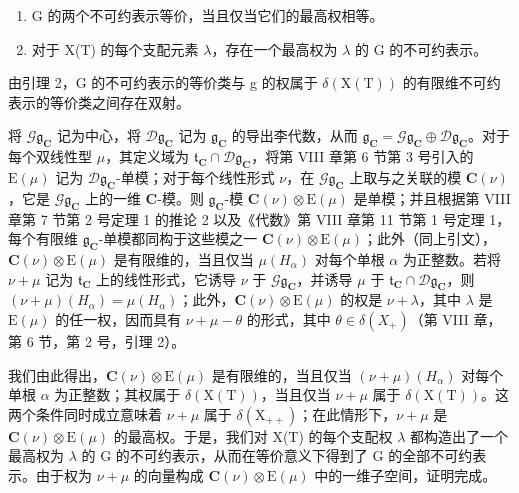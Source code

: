 \begin{enumerate}
\def\labelenumi{\alph{enumi})}
\setcounter{enumi}{1}
\item
  G 的两个不可约表示等价，当且仅当它们的最高权相等。
\item
  对于 X(T) 的每个支配元素 \(\lambda\)，存在一个最高权为 \(\lambda\) 的 G 的不可约表示。
\end{enumerate}

由引理 2，G 的不可约表示的等价类与 g 的权属于 \(\delta(\mathrm{X}(\mathrm{T}))\) 的有限维不可约表示的等价类之间存在双射。

将 \(\mathcal{G}\mathfrak{g}_{\mathbf{C}}\) 记为中心，将 \(\mathcal{D}\mathfrak{g}_{\mathbf{C}}\) 记为 \(\mathfrak{g}_{\mathbf{C}}\) 的导出李代数，从而 \(\mathfrak{g}_{\mathbf{C}} = \mathcal{G}\mathfrak{g}_{\mathbf{C}} \oplus \mathcal{D}\mathfrak{g}_{\mathbf{C}}\)。对于每个双线性型 \(\mu\)，其定义域为 \(\mathfrak{t}_{\mathbf{C}} \cap \mathcal{D}\mathfrak{g}_{\mathbf{C}}\)，将第 VIII 章第 6 节第 3 号引入的 \(\mathrm{E}(\mu)\) 记为 \(\mathcal{D}\mathfrak{g}_{\mathbf{C}}\)-单模；对于每个线性形式 \(\nu\)，在 \(\mathcal{G}\mathfrak{g}_{\mathbf{C}}\) 上取与之关联的模 \(\mathbf{C}(\nu)\)，它是 \(\mathcal{G}\mathfrak{g}_{\mathbf{C}}\) 上的一维 \(\mathbf{C}\)-模。则 \(\mathfrak{g}_{\mathbf{C}}\)-模 \(\mathbf{C}(\nu) \otimes \mathrm{E}(\mu)\) 是单模；并且根据第 VIII 章第 7 节第 2 号定理 1 的推论 2 以及《代数》第 VIII 章第 11 节第 1 号定理 1，每个有限维 \(\mathfrak{g}_{\mathbf{C}}\)-单模都同构于这些模之一 \(\mathbf{C}(\nu) \otimes \mathrm{E}(\mu)\)；此外（同上引文），\(\mathbf{C}(\nu) \otimes \mathrm{E}(\mu)\) 是有限维的，当且仅当 \(\mu(H_{\alpha})\) 对每个单根 \(\alpha\) 为正整数。若将 \(\nu + \mu\) 记为 \(\mathfrak{t}_{\mathbf{C}}\) 上的线性形式，它诱导 \(\nu\) 于 \(\mathcal{G}\mathfrak{g}_{\mathbf{C}}\)，并诱导 \(\mu\) 于 \(\mathfrak{t}_{\mathbf{C}} \cap \mathcal{D}\mathfrak{g}_{\mathbf{C}}\)，则 \((\nu + \mu)(H_{\alpha}) = \mu(H_{\alpha})\)；此外，\(\mathbf{C}(\nu) \otimes \mathrm{E}(\mu)\) 的权是 \(\nu + \lambda\)，其中 \(\lambda\) 是 \(\mathrm{E}(\mu)\) 的任一权，因而具有 \(\nu + \mu - \theta\) 的形式，其中 \(\theta \in \delta(X_{+})\)（第 VIII 章，第 6 节，第 2 号，引理 2）。

我们由此得出，\(\mathbf{C}(\nu)\otimes\mathrm{E}(\mu)\) 是有限维的，当且仅当 \((\nu+\mu)(H_{\alpha})\) 对每个单根 \(\alpha\) 为正整数；其权属于 \(\delta(\mathrm{X}(\mathrm{T}))\)，当且仅当 \(\nu+\mu\) 属于 \(\delta(\mathrm{X}(\mathrm{T}))\)。这两个条件同时成立意味着 \(\nu+\mu\) 属于 \(\delta(\mathrm{X}_{++})\)；在此情形下，\(\nu+\mu\) 是 \(\mathbf{C}(\nu)\otimes\mathrm{E}(\mu)\) 的最高权。于是，我们对 X(T) 的每个支配权 \(\lambda\) 都构造出了一个最高权为 \(\lambda\) 的 G 的不可约表示，从而在等价意义下得到了 G 的全部不可约表示。由于权为 \(\nu+\mu\) 的向量构成 \(\mathbf{C}(\nu)\otimes\mathrm{E}(\mu)\) 中的一维子空间，证明完成。

